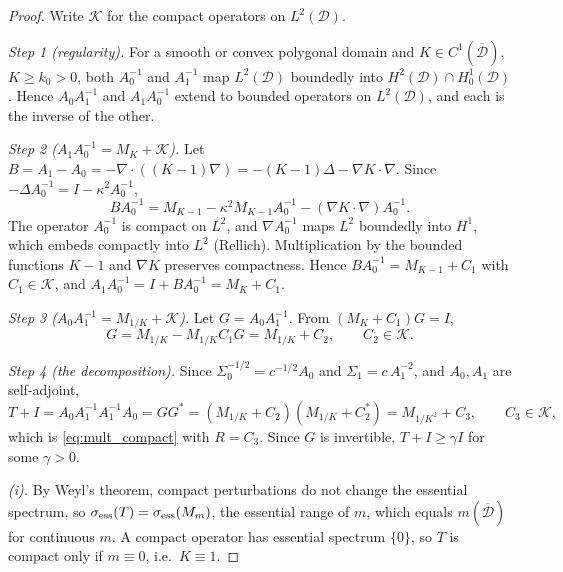 \documentclass[11pt]{article}
\numberwithin{table}{section}
\numberwithin{figure}{section}
\begin{document}
\begin{proof}
Write $\mathcal K$ for the compact operators on $L^2(\mathcal D)$.

\emph{Step 1 (regularity).} For a smooth or convex polygonal domain and $K\in C^1(\overline{\mathcal D})$, $K\ge k_0>0$, both $A_0^{-1}$ and $A_1^{-1}$ map $L^2(\mathcal D)$ boundedly into $H^2(\mathcal D)\cap H^1_0(\mathcal D)$. Hence $A_0A_1^{-1}$ and $A_1A_0^{-1}$ extend to bounded operators on $L^2(\mathcal D)$, and each is the inverse of the other.

\emph{Step 2 ($A_1A_0^{-1}=M_K+\mathcal K$).} Let $B=A_1-A_0=-\nabla\!\cdot((K-1)\nabla)=-(K-1)\Delta-\nabla K\cdot\nabla$. Since $-\Delta A_0^{-1}=I-\kappa^2A_0^{-1}$,
\begin{equation}
    BA_0^{-1}=M_{K-1}-\kappa^2M_{K-1}A_0^{-1}-(\nabla K\cdot\nabla)A_0^{-1}.
\end{equation}
The operator $A_0^{-1}$ is compact on $L^2$, and $\nabla A_0^{-1}$ maps $L^2$ boundedly into $H^1$, which embeds compactly into $L^2$ (Rellich). Multiplication by the bounded functions $K-1$ and $\nabla K$ preserves compactness. Hence $BA_0^{-1}=M_{K-1}+C_1$ with $C_1\in\mathcal K$, and $A_1A_0^{-1}=I+BA_0^{-1}=M_K+C_1$.

\emph{Step 3 ($A_0A_1^{-1}=M_{1/K}+\mathcal K$).} Let $G=A_0A_1^{-1}$. From $(M_K+C_1)G=I$,
\begin{equation}
    G=M_{1/K}-M_{1/K}C_1G=M_{1/K}+C_2,
    \qquad
    C_2\in\mathcal K.
\end{equation}

\emph{Step 4 (the decomposition).} Since $\Sigma_0^{-1/2}=c^{-1/2}A_0$ and $\Sigma_1=c\,A_1^{-2}$, and $A_0,A_1$ are self-adjoint,
\begin{equation}
    T+I=A_0A_1^{-1}A_1^{-1}A_0=GG^*=(M_{1/K}+C_2)(M_{1/K}+C_2^*)=M_{1/K^2}+C_3,
    \qquad
    C_3\in\mathcal K,
\end{equation}
which is \eqref{eq:mult_compact} with $R=C_3$. Since $G$ is invertible, $T+I\ge\gamma I$ for some $\gamma>0$.

\emph{(i).} By Weyl's theorem, compact perturbations do not change the essential spectrum, so $\sigma_{\rm ess}(T)=\sigma_{\rm ess}(M_m)$, the essential range of $m$, which equals $m(\overline{\mathcal D})$ for continuous $m$. A compact operator has essential spectrum $\{0\}$, so $T$ is compact only if $m\equiv0$, i.e.\ $K\equiv1$.


\end{proof}
\end{document}

